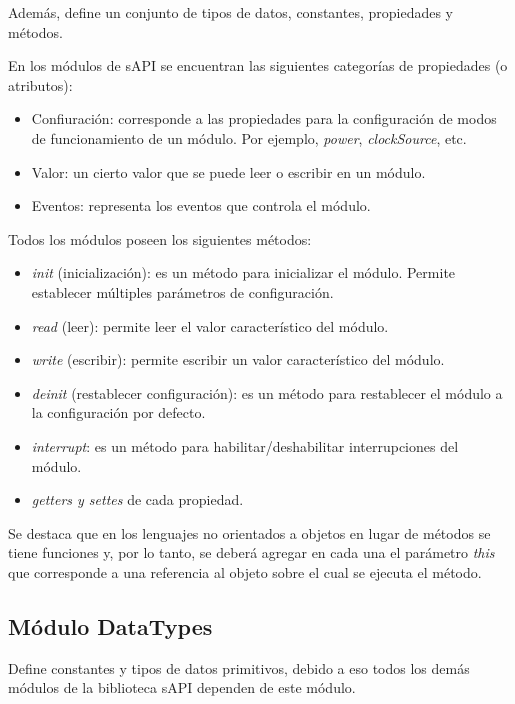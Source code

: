 Además, define un conjunto de tipos de datos, constantes, propiedades y métodos.

En los módulos de sAPI se encuentran las siguientes categorías de propiedades (o atributos):

\begin{itemize}
\item
Confiuración: corresponde a las propiedades para la configuración de modos de funcionamiento de un módulo. Por ejemplo, \emph{power}, \emph{clockSource}, etc.
\item
Valor: un cierto valor que se puede leer o escribir en un módulo.
\item
Eventos: representa los eventos que controla el módulo.
\end{itemize}

Todos los módulos poseen los siguientes métodos:

\begin{itemize}
\item
\emph{init} (inicialización): es un método para inicializar el módulo. Permite establecer múltiples parámetros de configuración.
\item
\emph{read} (leer): permite leer el valor característico del módulo.
\item
\emph{write} (escribir): permite escribir un valor característico del módulo.
\item
\emph{deinit} (restablecer configuración): es un método para restablecer el módulo a la configuración por defecto.
\item
\emph{interrupt}: es un método para habilitar/deshabilitar interrupciones del módulo.
\item
\emph{getters y settes} de cada propiedad.
\end{itemize}

Se destaca que en los lenguajes no orientados a objetos en lugar de métodos se tiene funciones y, por lo tanto, se deberá agregar en cada una el parámetro \emph{this} que corresponde a una referencia al objeto sobre el cual se ejecuta el método.

\subsection{Módulo DataTypes}

Define constantes y tipos de datos primitivos, debido a eso todos los demás módulos de la biblioteca sAPI dependen de este módulo.

